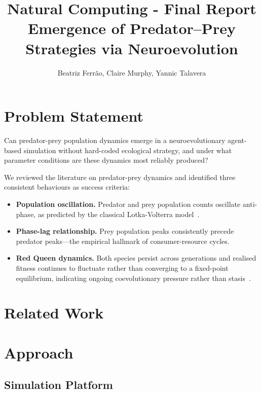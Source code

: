 \documentclass[11pt]{article}
\begin{document}
\title{Natural Computing - Final Report\\ Emergence of Predator–Prey Strategies via Neuroevolution}
\author{Beatriz Ferrão, Claire Murphy, Yannic Talavera}
\date{}
\maketitle


\section{Problem Statement}

Can predator-prey population dynamics emerge in a neuroevolutionary agent-based simulation
without hard-coded ecological strategy, and under what parameter conditions are these dynamics
most reliably produced?

We reviewed the literature on predator-prey dynamics and identified three consistent
behaviours as success criteria:

\begin{itemize}
    \item \textbf{Population oscillation.} Predator and prey population counts oscillate
          anti-phase, as predicted by the classical Lotka-Volterra
          model~\cite{lotka1925,volterra1926}.
    \item \textbf{Phase-lag relationship.} Prey population peaks consistently precede predator
          peaks—the empirical hallmark of consumer-resource cycles.
    \item \textbf{Red Queen dynamics.} Both species persist across generations and realised
          fitness continues to fluctuate rather than converging to a fixed-point equilibrium,
          indicating ongoing coevolutionary pressure rather than
          stasis~\cite{valen1973,dieckmann1995}.
\end{itemize}

\section{Related Work}



\section{Approach}

\subsection{Simulation Platform}
\end{document}
